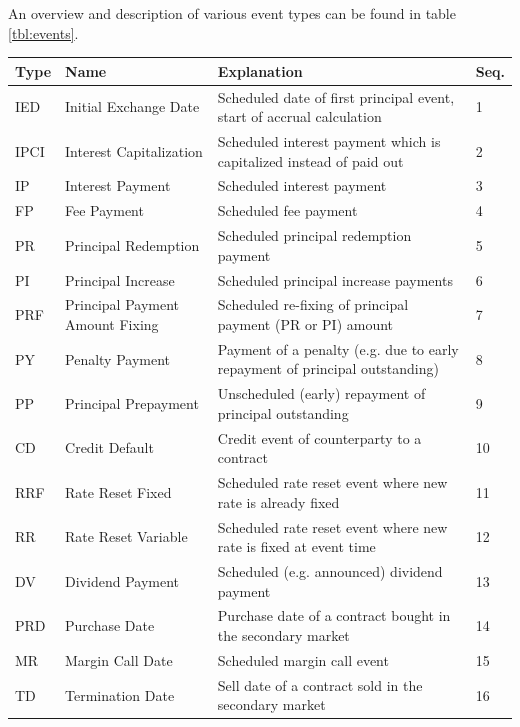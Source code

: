 \documentclass[9pt,oneside]{amsart}
\begin{document}
\begin{multicols}{2}
An overview and description of various event types can be found in table \ref{tbl:events}. 




\begin{table}[H]
	\begin{tabular}{| p{0.23in}p{0.7in}p{1.4in}p{0.2in} |}
	\hline
	\textbf{Type} & \textbf{Name} & \textbf{Explanation} & \textbf{Seq.} \\
	\hline
	IED & Initial Exchange Date & Scheduled date of first principal event, start of accrual calculation & 1 \\
	\hline
	IPCI & Interest Capitalization & Scheduled interest payment which is capitalized instead of paid out & 2 \\
	\hline
	IP & Interest Payment & Scheduled interest payment & 3 \\
	\hline
	FP & Fee Payment & Scheduled fee payment & 4 \\
	\hline
	PR & Principal Redemption & Scheduled principal redemption payment & 5 \\
	\hline
	PI & Principal Increase & Scheduled principal increase payments & 6 \\	
	\hline
	PRF & Principal Payment Amount Fixing & Scheduled re-fixing of principal payment (PR or PI) amount & 7 \\
	PY & Penalty Payment & Payment of a penalty (e.g. due to early repayment of principal outstanding) & 8 \\
	\hline
	PP & Principal Prepayment & Unscheduled (early) repayment of principal outstanding & 9 \\
	\hline
	CD & Credit Default & Credit event of counterparty to a contract & 10 \\
	\hline
	RRF & Rate Reset Fixed & Scheduled rate reset event where new rate is already fixed & 11 \\
	\hline
	RR & Rate Reset Variable & Scheduled rate reset event where new rate is fixed at event time & 12 \\
	\hline
	DV & Dividend Payment & Scheduled (e.g. announced) dividend payment & 13 \\
	\hline
	PRD & Purchase Date & Purchase date of a contract bought in the secondary market & 14 \\
	\hline
	MR & Margin Call Date & Scheduled margin call event & 15 \\
	\hline
	TD & Termination Date & Sell date of a contract sold in the secondary market & 16 \\

\end{tabular}
\end{table}
\end{multicols}
\end{document}
